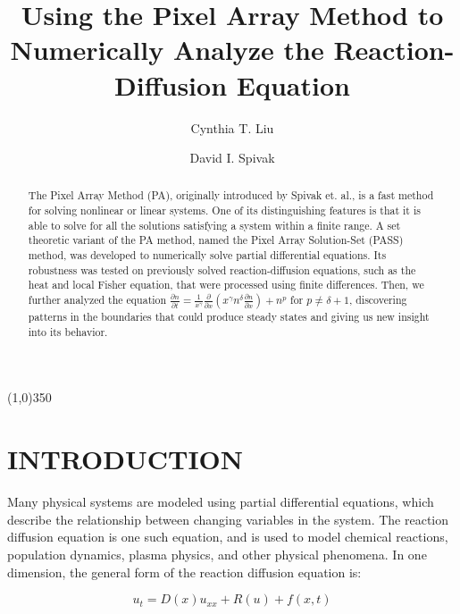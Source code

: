 \documentclass{article}
\begin{document}
\title{Using the Pixel Array Method to Numerically Analyze the Reaction-Diffusion Equation}
\author[1]{Cynthia T. Liu}
\author[2]{David I. Spivak}

\maketitle

\begin{abstract}
The Pixel Array Method (PA), originally introduced by Spivak et. al., is a fast method for solving nonlinear or linear systems. One of its distinguishing features is that it is able to solve for all the solutions satisfying a system within a finite range. A set theoretic variant of the PA method, named the Pixel Array Solution-Set (PASS) method, was developed to numerically solve partial differential equations. Its robustness was tested on previously solved reaction-diffusion equations, such as the heat and local Fisher equation, that were processed using finite differences. Then, we further analyzed the equation
$\frac{\partial{n}}{\partial{t}} = \frac{1}{x^\gamma} \frac{\partial}{\partial{x}}\left(x^\gamma n^\delta \frac{\partial{n}}{\partial{x}} \right) + n^p$
for $p \ne \delta + 1$, discovering patterns in the boundaries that could produce steady states and giving us new insight into its behavior.
\end{abstract}

\begin{center}
\line(1,0){350}
\end{center}

\section{INTRODUCTION}

Many physical systems are modeled using partial differential equations, which describe the relationship between changing variables in the system. The reaction diffusion equation is one such equation, and is used to model chemical reactions, population dynamics, plasma physics, and other physical phenomena. In one dimension, the general form of the reaction diffusion equation is:

\begin{equation}
    \label{Reaction-Diffusion Equation}
    u_t = D(x)u_{xx} + R(u) + f(x,t)
\end{equation}
\end{document}
